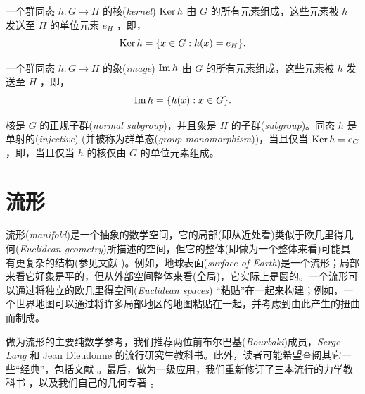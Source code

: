 \documentclass[11pt,fontset=founder]{ctexart}
\begin{document}
一个群同态 $h:G\rightarrow H $ 的核(\emph{kernel}) $\mathop{\rm Ker}h$ 由 $G$ 的所有元素组成，这些元素被 $h$ 发送至 $H$ 的单位元素 $e_{H}$ ，即，
\begin{equation*}
\mathop{\rm Ker}h=\{x\in G:h(x)=e_{H}\}.
\end{equation*}

一个群同态 $h:G\rightarrow H$ 的象(\emph{image}) $\mathop{\rm Im}h$ 由 $G$ 的所有元素组成，这些元素被 $h$ 发送至 $H$ ，即，
\begin{equation*}
\mathop{\rm Im}h=\{h(x):x\in G\}.
\end{equation*}

核是 $G$ 的正规子群(\emph{normal subgroup})，并且象是 $H$ 的子群(\emph{subgroup})。同态 $h$ 是单射的(\emph{injective}) (并被称为群单态(\emph{group monomorphism}))，当且仅当 $\mathop{\rm Ker}h=e_{G}$，即，当且仅当 $h$ 的核仅由 $G$ 的单位元素组成。

\section{流形}

流形(\textit{manifold})是一个抽象的数学空间，它的局部(即从近处看)类似于欧几里得几何(\textit{Euclidean
geometry})所描述的空间，但它的整体(即做为一个整体来看)可能具有更复杂的结构(参见文献 \cite{de Rham})。例如，地球表面(\textit{surface
of Earth})是一个流形；局部来看它好象是平的，但从外部空间整体来看(全局)，它实际上是圆的。一个流形可以通过将独立的欧几里得空间(\textit{Euclidean spaces}) ``粘贴''在一起来构建；例如，一个世界地图可以通过将许多局部地区的地图粘贴在一起，并考虑到由此产生的扭曲而制成。

做为流形的主要纯数学参考，我们推荐两位前布尔巴基(\emph{Bourbaki})成员，\emph{Serge Lang}
\cite{LangMan,LangDg} 和 Jean Dieudonne \cite{Dieudonne,Dieudonne2} 的流行研究生教科书。此外，读者可能希望查阅其它一些``经典''，包括文献 \cite{de Rham,Spivak,SpivakDG,Bruhat,Choquet,Bott,Abraham}。最后，做为一级应用，我们重新修订了三本流行的力学教科书 \cite{AbrahamMeh,Arnold,Marsden}，以及我们自己的几何专著 \cite{GaneshSprBig,GaneshADG}。
\end{document}
